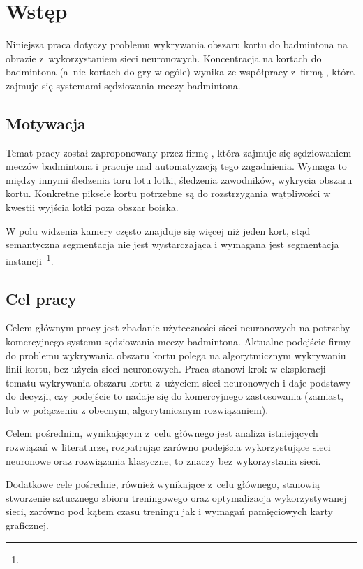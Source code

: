 \chapter{Wstęp}

Niniejsza praca dotyczy problemu wykrywania obszaru kortu do badmintona na obrazie z~wykorzystaniem sieci neuronowych.
Koncentracja na kortach do badmintona (a~nie kortach do gry w ogóle) wynika ze współpracy z~firmą \blue{}, która zajmuje się systemami sędziowania meczy badmintona.

\section{Motywacja}

Temat pracy został zaproponowany przez firmę \blue{}, która zajmuje się sędziowaniem meczów badmintona i pracuje nad automatyzacją tego zagadnienia.
Wymaga to między innymi śledzenia toru lotu lotki, śledzenia zawodników, wykrycia obszaru kortu.
Konkretne piksele kortu potrzebne są do rozstrzygania wątpliwości w kwestii wyjścia lotki poza obszar boiska.

W polu widzenia kamery często znajduje się więcej niż jeden kort, stąd semantyczna segmentacja nie jest wystarczająca i wymagana jest segmentacja instancji~\footnote{}.

\section{Cel pracy}

Celem głównym pracy jest zbadanie użyteczności sieci neuronowych na potrzeby komercyjnego systemu sędziowania meczy badmintona.
Aktualne podejście firmy \blue{} do problemu wykrywania obszaru kortu polega na algorytmicznym wykrywaniu linii kortu, bez użycia sieci neuronowych.
Praca stanowi krok w eksploracji tematu wykrywania obszaru kortu z~użyciem sieci neuronowych i daje podstawy do decyzji, czy podejście to nadaje się do komercyjnego zastosowania (zamiast, lub w połączeniu z obecnym, algorytmicznym rozwiązaniem).

Celem pośrednim, wynikającym z~celu głównego jest analiza istniejących rozwiązań w literaturze, rozpatrując zarówno podejścia wykorzystujące sieci neuronowe oraz rozwiązania klasyczne, to znaczy bez wykorzystania sieci.

Dodatkowe cele pośrednie, również wynikające z~celu głównego, stanowią stworzenie sztucznego zbioru treningowego oraz optymalizacja wykorzystywanej sieci, zarówno pod kątem czasu treningu jak i wymagań pamięciowych karty graficznej.

